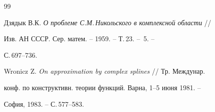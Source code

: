 \begin{thebibliography}{99}


Дзядык В.К. {\em О проблеме С.М.\,Никольского в комплексной области} //


Изв. АН СССР. Сер. матем. -- 1959. -- Т.\,23. -- \No\,5. --


С.\,697--736.




Wronicz Z. {\em On approximation by complex splines} // Тр. Междунар.


конф. по конструктивн. теории функций. Варна, 1--5 июня 1981. --


София, 1983. -- С.\,577--583.








\end{thebibliography}





\vskip 2cm














\label{end}






